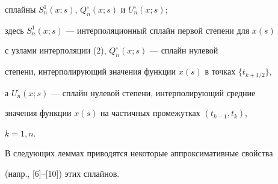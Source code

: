 сплайны $S_n^1(x;s)$, $Q_n^\circ (x;s)$ и $U_n^\circ (x;s)$;


здесь $S_n^1(x;s)$ --- интерполяционный сплайн первой степени для $x(s)$


с узлами интерполяции (2), $Q_n^\circ (x;s)$ --- сплайн нулевой


степени, интерполирующий значения функции $x(s)$ в точках $\{t_{k+1/2}\}$,


а $U_n^\circ (x;s)$ --- сплайн нулевой степени, интерполирующий средние


значения функции $x(s)$ на частичных промежутках $(t_{k-1},t_k)$,


$k=\overline{1,n}$.





В следующих леммах приводятся некоторые аппроксимативные свойства


(напр., [6]--[10]) этих сплайнов.








